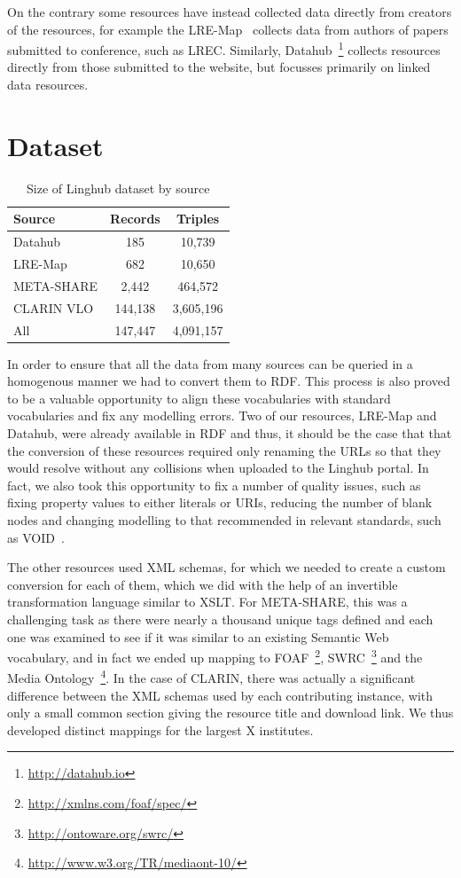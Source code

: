 \documentclass{acm_proc_article-sp}
\begin{document}
On the contrary some resources have instead collected data directly from
creators of the resources, for example the LRE-Map~\cite{calzolari2012lre} collects data from
authors of papers submitted to conference, such as LREC. Similarly,
Datahub~\footnote{\url{http://datahub.io}} collects resources directly from
those submitted to the website, but focusses primarily on linked data resources.

\section{Dataset}

\begin{table}
	\centering
	\begin{tabular}{p{30mm}|cc}
	Source               & Records    & Triples  \\
	\hline
	Datahub              & 185        & 10,739   \\
	LRE-Map              & 682        & 10,650   \\
	META-SHARE           & 2,442      & 464,572  \\
	CLARIN VLO           & 144,138    & 3,605,196\\
	\hline
	All                  & 147,447    & 4,091,157\\
	\end{tabular}
	\caption{Size of Linghub dataset by source\label{tab:size}}
\end{table}

In order to ensure that all the data from many sources can be queried in a
homogenous manner we had to convert them to RDF. This process is also proved to
be a valuable opportunity to align these vocabularies with standard vocabularies
and fix any modelling errors. Two of our resources, LRE-Map and Datahub, were already available in RDF
and thus, it should be the case that that the conversion of these resources
required only renaming the URLs so that they would resolve without any
collisions when uploaded to the Linghub portal. In fact, we also took this
opportunity to fix a number of quality issues, such as fixing property values to
either literals or URIs, reducing the number of blank nodes and changing
modelling to that recommended in relevant standards, such as
VOID~\cite{alexander2011describing}. 

The other resources used XML schemas, for which we needed to create a custom
conversion for each of them, which we did with the help of an invertible
transformation language similar to XSLT. For META-SHARE, this was a challenging
task as there were nearly a thousand unique tags defined and each one was
examined to see if it was similar to an existing Semantic Web vocabulary, and in
fact we ended up mapping to FOAF~\footnote{\url{http://xmlns.com/foaf/spec/}},
SWRC~\footnote{\url{http://ontoware.org/swrc/}} and the Media
Ontology~\footnote{\url{http://www.w3.org/TR/mediaont-10/}}. In the case of
CLARIN, there was actually a significant difference between the XML schemas used
by each contributing instance, with only a small common section giving the
resource title and download link. We thus developed distinct mappings for the
largest X institutes.
\end{document}
